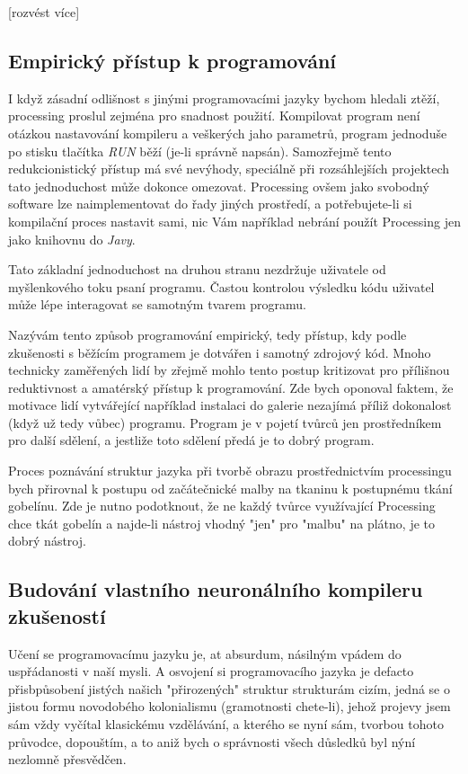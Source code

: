 \documentclass[11pt]{article} %
\begin{document}
[rozvést více]

\subsection{Empirický přístup k programování}

	I když zásadní odlišnost s jinými programovacími jazyky bychom hledali ztěží, processing proslul zejména pro snadnost použití. Kompilovat program není otázkou nastavování kompileru a veškerých jaho parametrů, program jednoduše po stisku tlačítka {\em RUN} běží (je-li správně napsán). Samozřejmě tento redukcionistický přístup má své nevýhody, speciálně při rozsáhlejších projektech tato jednoduchost může dokonce omezovat. Processing ovšem jako svobodný software lze naimplementovat do řady jiných prostředí, a potřebujete-li si kompilační proces nastavit sami, nic Vám například nebrání použít Processing jen jako knihovnu do {\em Javy}.

Tato základní jednoduchost na druhou stranu nezdržuje uživatele od myšlenkového toku psaní programu. Častou kontrolou výsledku kódu uživatel může lépe interagovat se samotným tvarem programu.

Nazývám tento způsob programování empirický, tedy přístup, kdy podle zkušenosti s běžícím programem je dotvářen i samotný zdrojový kód. Mnoho technicky zaměřených lidí by zřejmě mohlo tento postup kritizovat pro přílišnou reduktivnost a amatérský přístup k programování. Zde bych oponoval faktem, že motivace lidí vytvářející například instalaci do galerie nezajímá příliž dokonalost (když už tedy vůbec) programu. Program je v pojetí tvůrců jen prostředníkem pro další sdělení, a jestliže toto sdělení předá je to dobrý program.

Proces poznávání struktur jazyka při tvorbě obrazu prostřednictvím processingu bych přirovnal k postupu od začátečnické malby na tkaninu k postupnému tkání gobelínu. Zde je nutno podotknout, že ne každý tvůrce využívající Processing chce tkát gobelín a najde-li nástroj vhodný "jen" pro "malbu" na plátno, je to dobrý nástroj.

\subsection{Budování vlastního neuronálního kompileru zkušeností}



Učení se programovacímu jazyku je, at absurdum, násilným vpádem do uspřádanosti v naší mysli. A osvojení si programovacího jazyka je defacto přisbpůsobení jistých našich "přirozených" struktur strukturám cizím, jedná se o jistou formu novodobého kolonialismu (gramotnosti chete-li), jehož projevy jsem sám vždy vyčítal klasickému vzdělávání, a kterého se nyní sám, tvorbou tohoto průvodce, dopouštím, a to aniž bych o správnosti všech důsledků byl nýní nezlomně přesvědčen.
\end{document}
